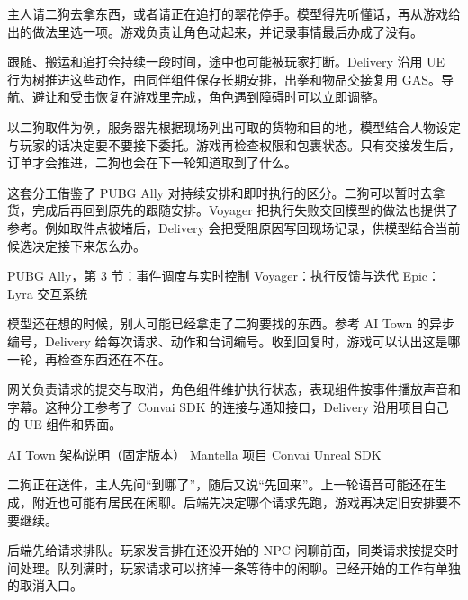\documentclass[11pt]{article}
\begin{document}

主人请二狗去拿东西，或者请正在追打的翠花停手。模型得先听懂话，再从游戏给出的做法里选一项。游戏负责让角色动起来，并记录事情最后办成了没有。


跟随、搬运和追打会持续一段时间，途中也可能被玩家打断。Delivery 沿用 UE 行为树推进这些动作，由同伴组件保存长期安排，出拳和物品交接复用 GAS。导航、避让和受击恢复在游戏里完成，角色遇到障碍时可以立即调整。

以二狗取件为例，服务器先根据现场列出可取的货物和目的地，模型结合人物设定与玩家的话决定要不要接下委托。游戏再检查权限和包裹状态。只有交接发生后，订单才会推进，二狗也会在下一轮知道取到了什么。

这套分工借鉴了 PUBG Ally 对持续安排和即时执行的区分。二狗可以暂时去拿货，完成后再回到原先的跟随安排。Voyager 把执行失败交回模型的做法也提供了参考。例如取件点被堵后，Delivery 会把受阻原因写回现场记录，供模型结合当前候选决定接下来怎么办。

{\small\href{https://arxiv.org/html/2609.29837v1#S3}{PUBG Ally，第 3 节：事件调度与实时控制}\quad
\href{https://github.com/MineDojo/Voyager}{Voyager：执行反馈与迭代}\quad
\href{https://dev.epicgames.com/documentation/en-us/unreal-engine/lyra-sample-game-interaction-system-in-unreal-engine}{Epic：Lyra 交互系统}}


模型还在想的时候，别人可能已经拿走了二狗要找的东西。参考 AI Town 的异步编号，Delivery 给每次请求、动作和台词编号。收到回复时，游戏可以认出这是哪一轮，再检查东西还在不在。

网关负责请求的提交与取消，角色组件维护执行状态，表现组件按事件播放声音和字幕。这种分工参考了 Convai SDK 的连接与通知接口，Delivery 沿用项目自己的 UE 组件和界面。

{\small\href{https://github.com/a16z-infra/ai-town/blob/1b2f7d8b824c7bc679017a091d9d45ba3dc3029e/ARCHITECTURE.md}{AI Town 架构说明（固定版本）}\quad
\href{https://github.com/Mantella-Software/Mantella}{Mantella 项目}\quad
\href{https://github.com/Conv-AI/Convai-UnrealEngine-SDK-V4}{Convai Unreal SDK}}

\clearpage
{}

二狗正在送件，主人先问“到哪了”，随后又说“先回来”。上一轮语音可能还在生成，附近也可能有居民在闲聊。后端先决定哪个请求先跑，游戏再决定旧安排要不要继续。

后端先给请求排队。玩家发言排在还没开始的 NPC 闲聊前面，同类请求按提交时间处理。队列满时，玩家请求可以挤掉一条等待中的闲聊。已经开始的工作有单独的取消入口。
\end{document}
